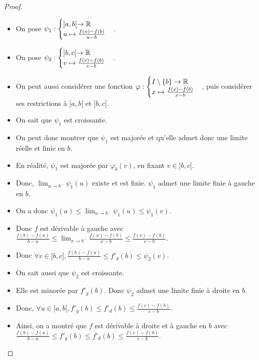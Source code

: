 \documentclass[12pt, a4paper]{report}
\begin{document}
\begin{proof}
  \begin{itemize}
    \item On pose $\psi_1:\begin{cases} ]a,b[\to\mathbb{R} \\ u\mapsto \frac{f(u)-f(b)}{u-b} \end{cases}$.
    \item On pose $\psi_2:\begin{cases} ]b,c[\to\mathbb{R} \\ v\mapsto \frac{f(v)-f(b)}{v-b} \end{cases}$.
    \item On peut aussi considérer une fonction $\varphi : \begin{cases} I\setminus\{b\}\to\mathbb{R} \\ x\mapsto \frac{f(x)-f(b)}{x-b} \end{cases}$, puis considérer ses restrictions à $]a,b[$ et $]b,c[$.
    \item On sait que $\psi_1$ est croissante.
    \item On peut donc montrer que $\psi_1$ est majorée et qu'elle admet donc une limite réelle et finie en $b$.
    \item En réalité, $\psi_1$ est majorée par $\varphi_b(v)$, en fixant $v\in]b,c[$.
    \item Donc, $\lim_{u\to b^-}\psi_1(u)$ existe et est finie. $\psi_1$ admet une limite finie à gauche en $b$.
    \item On a donc $\psi_1(a) \le \lim_{u\to b^-}\psi_1(u) \le \psi_1(v)$.
    \item Donc $f$ est dérivable à gauche avec $\frac{f(b)-f(a)}{b-a} \le \lim_{x \to b^-}\frac{f(x)-f(b)}{x-b} \le \frac{f(v)-f(b)}{v-b}$.
    \item Donc $\forall v \in ]b,c[, \frac{f(b)-f(a)}{b-a} \le f'_g(b) \le \psi_2(v)$.
    \item On sait aussi que $\psi_2$ est croissante.
    \item Elle est minorée par $f'_g(b)$. Donc $\psi_2$ admet une limite finie à droite en $b$.
    \item Donc, $\forall u \in ]a,b[, f'_g(b) \le f'_d(b) \le \frac{f(c)-f(b)}{c-b}$.
    \item Ainsi, on a montré que $f$ est dérivable à droite et à gauche en $b$ avec $\frac{f(b)-f(a)}{b-a} \le f'_g(b) \le f'_d(b) \le \frac{f(c)-f(b)}{c-b}$.
  \end{itemize}
\end{proof}
\end{document}
